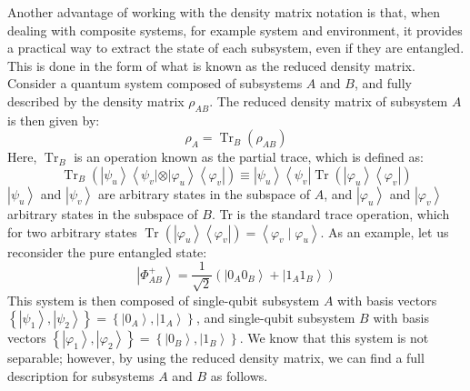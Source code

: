 Another advantage of working with the density matrix notation is that, when dealing with composite systems, for example system and environment, it provides a practical way to extract the state of each subsystem, even if they are entangled. This is done in the form of what is known as the reduced density matrix.
Consider a quantum system composed of subsystems $A$ and $B$, and fully described by the density matrix $\rho_{A B}$. The reduced density matrix of subsystem $A$ is then given by:
$$
\rho_{A}=\operatorname{Tr}_{B}\left(\rho_{A B}\right)
$$
Here, $\operatorname{Tr}_{B}$ is an operation known as the partial trace, which is defined as:
$$
\operatorname{Tr}_{B}\left(\left|\psi_{u}\right\rangle\left\langle\psi_{v}|\otimes| \varphi_{u}\right\rangle\left\langle\varphi_{v}\right|\right) \equiv\left|\psi_{u}\right\rangle\left\langle\psi_{v}\right| \operatorname{Tr}\left(\left|\varphi_{u}\right\rangle\left\langle\varphi_{v}\right|\right)
$$
$\left|\psi_{u}\right\rangle$ and $\left|\psi_{v}\right\rangle$ are arbitrary states in the subspace of $A$, and $\left|\varphi_{u}\right\rangle$ and $\left|\varphi_{v}\right\rangle$ arbitrary states in the subspace of $B$. Tr is the standard trace operation, which for two arbitrary states $\operatorname{Tr}\left(\left|\varphi_{u}\right\rangle\left\langle\varphi_{v}\right|\right)=\left\langle\varphi_{v} \mid \varphi_{u}\right\rangle$. 
As an example, let us reconsider the pure entangled state:
$$
\left|\Phi^{+}_{A B}\right\rangle=\frac{1}{\sqrt{2}}\left(\left|0_{A} 0_{B}\right\rangle+\left|1_{A} 1_{B}\right\rangle\right)
$$
This system is then composed of single-qubit subsystem $A$ with basis vectors $\left\{\left|\psi_{1}\right\rangle,\left|\psi_{2}\right\rangle\right\}=\left\{\left|0_{A}\right\rangle,\left|1_{A}\right\rangle\right\}$, and single-qubit subsystem $B$ with basis vectors $\left\{\left|\varphi_{1}\right\rangle,\left|\varphi_{2}\right\rangle\right\}=\left\{\left|0_{B}\right\rangle,\left|1_{B}\right\rangle\right\} .$ We know that this system is not separable; however, by using the reduced density matrix, we can find a full description for subsystems $A$ and $B$ as follows.

